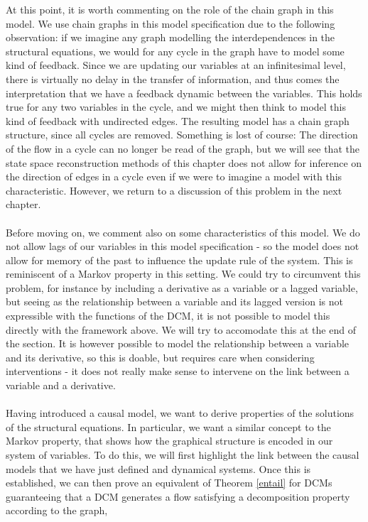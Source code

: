 \documentclass[11pt, a4paper]{memoir}
\theoremstyle{break}
\theoremstyle{break}
\theoremstyle{nonumberplain}
\begin{document}
At this point, it is worth commenting on the role of the chain graph in this model. We use chain graphs in this model specification due to the following observation: if we imagine any graph modelling the interdependences in the structural equations, we would for any cycle in the graph have to model some kind of feedback. Since we are updating our variables at an infinitesimal level, there is virtually no delay in the transfer of information, and thus comes the interpretation that we have a feedback dynamic between the variables. This holds true for any two variables in the cycle, and we might then think to model this kind of feedback with undirected edges. The resulting model has a chain graph structure, since all cycles are removed. Something is lost of course: The direction of the flow in a cycle can no longer be read of the graph, but we will see that the state space reconstruction methods of this chapter does not allow for inference on the direction of edges in a cycle even if we were to imagine a model with this characteristic. However, we return to a discussion of this problem in the next chapter.\\\\
Before moving on, we comment also on some characteristics of this model. We do not allow lags of our variables in this model specification - so the model does not allow for memory of the past to influence the update rule of the system. This is reminiscent of a Markov property in this setting. We could try to circumvent this problem, for instance by including a derivative as a variable or a lagged variable, but seeing as the relationship between a variable and its lagged version is not expressible with the functions of the DCM, it is not possible to model this directly with the framework above. We will try to accomodate this at the end of the section. It is however possible to model the relationship between a variable and its derivative, so this is doable, but requires care when considering interventions - it does not really make sense to intervene on the link between a variable and a derivative.\\\\
Having introduced a causal model, we want to derive properties of the solutions of the structural equations. In particular, we want a similar concept to the Markov property, that shows how the graphical structure is encoded in our system of variables. To do this, we will first highlight the link between the causal models that we have just defined and dynamical systems. Once this is established, we can then prove an equivalent of Theorem \ref{entail} for DCMs guaranteeing that a DCM generates a flow satisfying a decomposition property according to the graph,
\end{document}
